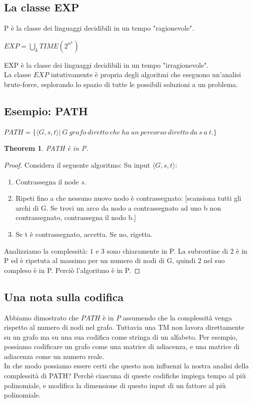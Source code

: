 \documentclass[a4paper, 12pt]{article}
\newtheorem{theorem}{Theorem}[section]
\begin{document}
\subsection{La classe EXP}
P \`e la classe dei linguaggi decidibili in un tempo "ragionevole". \begin{center}
$EXP = \bigcup_{k} TIME(2^{n^{k}})$
\end{center}
EXP \`e la classe dei linguaggi decidibili in un tempo "irragionevole".\\
La classe $EXP$ intutivamente \`e propria degli algoritmi che eseguono un'analisi brute-force, esplorando lo spazio di tutte le possibili soluzioni a un problema.
\subsection{Esempio: PATH}
$PATH = \{\langle G,s,t \rangle |\ G\ grafo\ diretto\ che\ ha\ un\ percorso\ diretto\ da\ s\ a\ t.\}$

\begin{theorem}
PATH \`e in P.
\end{theorem}
\begin{proof}
Considera il seguente algoritmo: 
Su input $\langle G, s,t \rangle$:

\begin{enumerate}
\item Contrassegna il node $s$.
\item Ripeti fino a che nessuno nuovo nodo \`e contrassegnato: [scansiona tutti gli archi di G. Se trovi un arco da nodo a contrassegnato ad uno b non contrassegnato, contrassegna il nodo b.]
\item Se t \`e contrassegnato, accetta. Se no, rigetta.
\end{enumerate}
Analizziamo la complessit\`a: $1$ e $3$ sono chiaramente in P. La subroutine di $2$ \`e in P ed \`e ripetuta al massimo per un numero di nodi di G, quindi $2$ nel suo compleso \`e in P. Perci\`o l'algoritmo \`e in P.
\end{proof}

\subsection{Una nota sulla codifica}
Abbiamo dimostrato che $PATH$ \`e in $P$ assumendo che la complessit\`a venga rispetto al numero di nodi nel grafo. Tuttavia una TM non lavora direttamente su un grafo ma su una sua codifica come stringa di un alfabeto. Per esempio, possiamo codificare un grafo come una matrice di adiacenza, e una matrice di adiacenza come un numero reale.\\ In che modo possiamo essere certi che questo non influenzi la nostra analisi della complessit\`a di PATH? Perch\`e  ciascuna di queste codifiche impiega tempo al pi\`u polinomiale, e modifica la dimensione di questo input di un fattore al pi\`u polinomiale.
\end{document}
